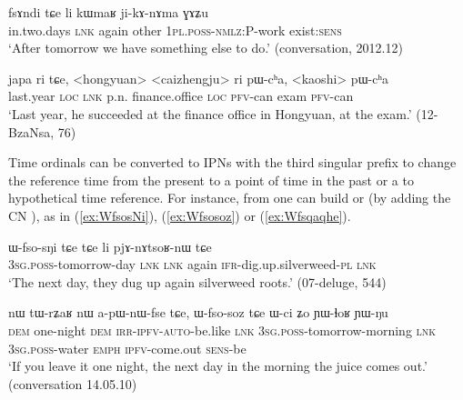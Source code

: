 \begin{exe}
\ex \label{ex:fsAndi}
\gll fsɤndi tɕe li kɯmaʁ ji-kɤ-nɤma ɣɤʑu \\
 in.two.days \textsc{lnk} again other \textsc{1pl}.\textsc{poss}-\textsc{nmlz}:P-work exist:\textsc{sens} \\
\glt `After tomorrow we have something else to do.' (conversation, 2012.12)
\end{exe}
 
\begin{exe}
\ex \label{ex:japa.ri}
\gll  japa ri tɕe, <hongyuan> <caizhengju> ri pɯ-cʰa, <kaoshi> pɯ-cʰa  \\
 last.year \textsc{loc} \textsc{lnk} p.n. finance.office \textsc{loc} \textsc{pfv}-can exam \textsc{pfv}-can \\
\glt `Last year, he succeeded at the finance office in Hongyuan, at the exam.' (12-BzaNsa, 76)
\end{exe}
 
  
Time ordinals can be converted to IPNs with the third singular prefix  to change the reference time from the present to a point of time in the past or a to hypothetical time reference. For instance,  from  one can build  or  (by adding the CN ), as in (\ref{ex:WfsosNi}), (\ref{ex:Wfsosoz}) or (\ref{ex:Wfsqaqhe}).

\begin{exe}
\ex \label{ex:WfsosNi}
\gll  ɯ-fso-sŋi tɕe tɕe li pjɤ-nɤtsoʁ-nɯ tɕe \\ 
 \textsc{3sg}.\textsc{poss}-tomorrow-day \textsc{lnk} \textsc{lnk} again \textsc{ifr}-dig.up.silverweed-\textsc{pl}  \textsc{lnk}\\
\glt `The next day, they dug up again silverweed roots.' (07-deluge, 544)
\end{exe}
  
\begin{exe}
\ex \label{ex:Wfsosoz}
\gll nɯ tɯ-rʑaʁ nɯ a-pɯ-nɯ-fse tɕe, ɯ-fso-soz tɕe ɯ-ci ʑo ɲɯ-ɬoʁ ɲɯ-ŋu  \\
 \textsc{dem} one-night \textsc{dem} \textsc{irr}-\textsc{ipfv}-\textsc{auto}-be.like \textsc{lnk} \textsc{3sg}.\textsc{poss}-tomorrow-morning \textsc{lnk} \textsc{3sg}.\textsc{poss}-water \textsc{emph} \textsc{ipfv}-come.out \textsc{sens}-be \\
\glt `If you leave it one night, the next day in the morning the juice comes out.' (conversation 14.05.10)
\end{exe}
   
